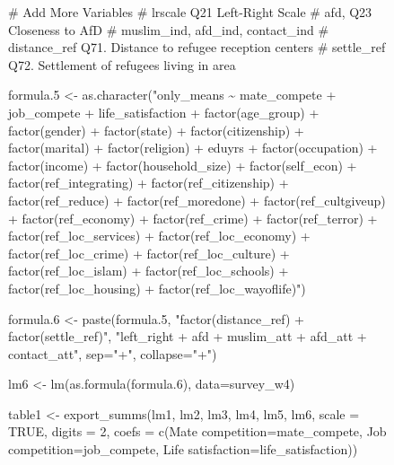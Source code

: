 \documentclass[
]{article}
\newenvironment{Shaded}{\begin{snugshade}}{\end{snugshade}}
\newcommand{\AttributeTok}[1]{\textcolor[rgb]{0.40,0.45,0.13}{#1}}
\newcommand{\CommentTok}[1]{\textcolor[rgb]{0.37,0.37,0.37}{#1}}
\newcommand{\ConstantTok}[1]{\textcolor[rgb]{0.56,0.35,0.01}{#1}}
\newcommand{\DecValTok}[1]{\textcolor[rgb]{0.68,0.00,0.00}{#1}}
\newcommand{\FloatTok}[1]{\textcolor[rgb]{0.68,0.00,0.00}{#1}}
\newcommand{\FunctionTok}[1]{\textcolor[rgb]{0.28,0.35,0.67}{#1}}
\newcommand{\NormalTok}[1]{\textcolor[rgb]{0.00,0.23,0.31}{#1}}
\newcommand{\OtherTok}[1]{\textcolor[rgb]{0.00,0.23,0.31}{#1}}
\newcommand{\StringTok}[1]{\textcolor[rgb]{0.13,0.47,0.30}{#1}}
\begin{document}
\begin{figure}
\begin{table}
\begin{minipage}[t]{\linewidth}
{\begin{Shaded}
\begin{Highlighting}[]
\CommentTok{\# Add More Variables }
\CommentTok{\# lrscale  Q21  Left{-}Right Scale}
\CommentTok{\# afd, Q23  Closeness to AfD}
\CommentTok{\# muslim\_ind, afd\_ind, contact\_ind}
\CommentTok{\# distance\_ref Q71. Distance to refugee reception centers}
\CommentTok{\# settle\_ref Q72. Settlement of refugees living in area}

\NormalTok{formula}\FloatTok{.5} \OtherTok{\textless{}{-}} 
  \FunctionTok{as.character}\NormalTok{(}\StringTok{"only\_means \textasciitilde{} mate\_compete + job\_compete + }
\StringTok{               life\_satisfaction +  factor(age\_group) + factor(gender) + }
\StringTok{               factor(state) + factor(citizenship) + factor(marital) + }
\StringTok{               factor(religion) + eduyrs + factor(occupation) + }
\StringTok{               factor(income) + factor(household\_size) + factor(self\_econ) + }
\StringTok{               factor(ref\_integrating) + factor(ref\_citizenship) + factor(ref\_reduce) + }
\StringTok{               factor(ref\_moredone) + factor(ref\_cultgiveup) + }
\StringTok{               factor(ref\_economy) + factor(ref\_crime) + factor(ref\_terror)  + }
\StringTok{               factor(ref\_loc\_services) +  factor(ref\_loc\_economy) + factor(ref\_loc\_crime) + }
\StringTok{               factor(ref\_loc\_culture) + factor(ref\_loc\_islam) + }
\StringTok{               factor(ref\_loc\_schools) + factor(ref\_loc\_housing) + factor(ref\_loc\_wayoflife)"}\NormalTok{)}

\NormalTok{formula}\FloatTok{.6} \OtherTok{\textless{}{-}} \FunctionTok{paste}\NormalTok{(formula}\FloatTok{.5}\NormalTok{, }\StringTok{"factor(distance\_ref) + factor(settle\_ref)"}\NormalTok{, }
                   \StringTok{"left\_right + afd + muslim\_att + afd\_att + contact\_att"}\NormalTok{, }
                   \AttributeTok{sep=}\StringTok{"+"}\NormalTok{, }\AttributeTok{collapse=}\StringTok{"+"}\NormalTok{) }

\NormalTok{lm6 }\OtherTok{\textless{}{-}} \FunctionTok{lm}\NormalTok{(}\FunctionTok{as.formula}\NormalTok{(formula}\FloatTok{.6}\NormalTok{), }\AttributeTok{data=}\NormalTok{survey\_w4)}

\NormalTok{table1 }\OtherTok{\textless{}{-}} \FunctionTok{export\_summs}\NormalTok{(lm1, lm2, lm3, lm4, lm5, lm6, }\AttributeTok{scale =} \ConstantTok{TRUE}\NormalTok{, }\AttributeTok{digits =} \DecValTok{2}\NormalTok{, }\AttributeTok{coefs =} \FunctionTok{c}\NormalTok{(}\StringTok{\textquotesingle{}Mate competition\textquotesingle{}}\OtherTok{=}\StringTok{\textquotesingle{}mate\_compete\textquotesingle{}}\NormalTok{, }\StringTok{\textquotesingle{}Job competition\textquotesingle{}}\OtherTok{=}\StringTok{\textquotesingle{}job\_compete\textquotesingle{}}\NormalTok{, }\StringTok{\textquotesingle{}Life satisfaction\textquotesingle{}}\OtherTok{=}\StringTok{\textquotesingle{}life\_satisfaction\textquotesingle{}}\NormalTok{)) }
  

\end{Highlighting}
\end{Shaded}}
\end{minipage}
\end{table}
\end{figure}
\end{document}
